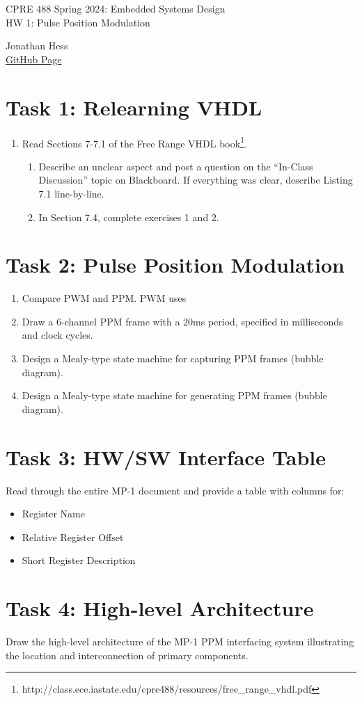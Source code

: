 \documentclass[10pt,a4paper]{article}
\author{}
\date{}
\begin{document}
\begin{flushleft}
\begin{LARGE}CPRE 488 Spring 2024: Embedded Systems Design\\
HW 1: Pulse Position Modulation \\
\end{LARGE}

Jonathan Hess
\\\href{https://github.com/Jetsama/CPRE488/tree/main/HW1}{GitHub Page}
\end{flushleft}
\author{}
\date{}




\section*{Task 1: Relearning VHDL}
\begin{enumerate}
    \item Read Sections 7-7.1 of the Free Range VHDL book\footnote{http://class.ece.iastate.edu/cpre488/resources/free\_range\_vhdl.pdf}.
    \begin{enumerate}
        \item Describe an unclear aspect and post a question on the “In-Class Discussion” topic on Blackboard. If everything was clear, describe Listing 7.1 line-by-line.
        
        
        
        \item In Section 7.4, complete exercises 1 and 2.
    \end{enumerate}
\end{enumerate}

\section*{Task 2: Pulse Position Modulation}
\begin{enumerate}
    \item Compare PWM and PPM.
    PWM uses 
    \item Draw a 6-channel PPM frame with a 20ms period, specified in milliseconds and clock cycles.
    \item Design a Mealy-type state machine for capturing PPM frames (bubble diagram).
    \item Design a Mealy-type state machine for generating PPM frames (bubble diagram).
\end{enumerate}

\section*{Task 3: HW/SW Interface Table}
Read through the entire MP-1 document and provide a table with columns for:
\begin{itemize}
    \item Register Name
    \item Relative Register Offset
    \item Short Register Description
\end{itemize}

\section*{Task 4: High-level Architecture}
Draw the high-level architecture of the MP-1 PPM interfacing system illustrating the location and interconnection of primary components.
\end{document}
